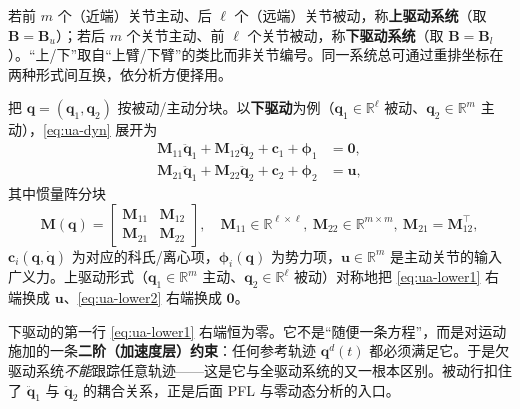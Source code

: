 \begin{definition}[上驱动与下驱动系统]\label{def:ua-upperlower}
若前 $m$ 个（近端）关节主动、后 $\ell$ 个（远端）关节被动，称\textbf{上驱动系统}（取 $\mathbf{B}=\mathbf{B}_u$）；若后 $m$ 个关节主动、前 $\ell$ 个关节被动，称\textbf{下驱动系统}（取 $\mathbf{B}=\mathbf{B}_l$）。“上/下”取自“上臂/下臂”的类比而非关节编号。同一系统总可通过重排坐标在两种形式间互换，依分析方便择用。
\end{definition}

把 $\mathbf{q}=(\mathbf{q}_1,\mathbf{q}_2)$ 按被动/主动分块。以\textbf{下驱动}为例（$\mathbf{q}_1\in\mathbb{R}^\ell$ 被动、$\mathbf{q}_2\in\mathbb{R}^m$ 主动），\cref{eq:ua-dyn} 展开为
\begin{align}
  \mathbf{M}_{11}\ddot{\mathbf{q}}_1+\mathbf{M}_{12}\ddot{\mathbf{q}}_2+\mathbf{c}_1+\boldsymbol{\phi}_1&=\mathbf{0},\label{eq:ua-lower1}\\
  \mathbf{M}_{21}\ddot{\mathbf{q}}_1+\mathbf{M}_{22}\ddot{\mathbf{q}}_2+\mathbf{c}_2+\boldsymbol{\phi}_2&=\mathbf{u},\label{eq:ua-lower2}
\end{align}
其中惯量阵分块
\begin{equation}\label{eq:ua-Mblock}
  \mathbf{M}(\mathbf{q})=\begin{bmatrix}\mathbf{M}_{11}&\mathbf{M}_{12}\\\mathbf{M}_{21}&\mathbf{M}_{22}\end{bmatrix},\quad
  \mathbf{M}_{11}\in\mathbb{R}^{\ell\times\ell},\ \mathbf{M}_{22}\in\mathbb{R}^{m\times m},\ \mathbf{M}_{21}=\mathbf{M}_{12}^\top,
\end{equation}
$\mathbf{c}_i(\mathbf{q},\dot{\mathbf{q}})$ 为对应的科氏/离心项，$\boldsymbol{\phi}_i(\mathbf{q})$ 为势力项，$\mathbf{u}\in\mathbb{R}^m$ 是主动关节的输入广义力。上驱动形式（$\mathbf{q}_1\in\mathbb{R}^m$ 主动、$\mathbf{q}_2\in\mathbb{R}^\ell$ 被动）对称地把 \cref{eq:ua-lower1} 右端换成 $\mathbf{u}$、\cref{eq:ua-lower2} 右端换成 $\mathbf{0}$。

\begin{note}[被动行就是二阶约束]
下驱动的第一行 \cref{eq:ua-lower1} 右端恒为零。它不是“随便一条方程”，而是对运动施加的一条\textbf{二阶（加速度层）约束}：任何参考轨迹 $\mathbf{q}^d(t)$ 都必须满足它。于是欠驱动系统\emph{不能}跟踪任意轨迹——这是它与全驱动系统的又一根本区别。被动行扣住了 $\ddot{\mathbf{q}}_1$ 与 $\ddot{\mathbf{q}}_2$ 的耦合关系，正是后面 PFL 与零动态分析的入口。
\end{note}

